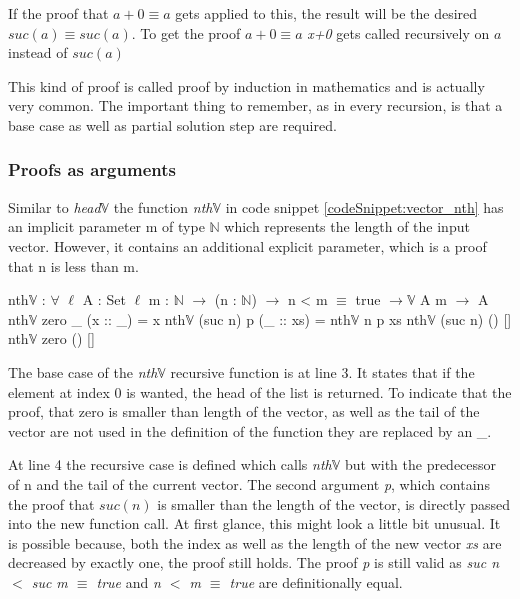 If the proof that $a + 0 \equiv a$ gets applied to this, the result will be the desired $suc(a) \equiv suc(a)$. 
To get the proof $a + 0 \equiv a$ \emph{x+0} gets called recursively on $a$ instead of $suc(a)$

This kind of proof is called proof by induction in mathematics and is actually very common.
The important thing to remember, as in every recursion, is that a base case as well as partial solution step are required.

\subsubsection{Proofs as arguments}

Similar to \emph{head$\mathbb{V}$} the function \emph{nth$\mathbb{V}$} in code snippet \ref{codeSnippet:vector_nth} has an implicit parameter m of type $\mathbb{N}$ which represents the length of the input vector. 
However, it contains an additional explicit parameter, which is a proof that n is less than m.

\begin{codesnippet}[mathescape=true, caption={Definition of \emph{nth} function in Agda}, label={codeSnippet:vector_nth}]
nth$\mathbb{V}$ : $\forall$ {$\ell$} {A : Set $\ell$} {m : $\mathbb{N}$} $\rightarrow$
       (n : $\mathbb{N}$) $\rightarrow$ n < m $\equiv$ true $\rightarrow \mathbb{V}$ A m $\rightarrow$ A
nth$\mathbb{V}$ zero _ (x :: _) = x
nth$\mathbb{V}$ (suc n) p (_ :: xs) = nth$\mathbb{V}$ n p xs
nth$\mathbb{V}$ (suc n) () []
nth$\mathbb{V}$ zero () []
\end{codesnippet}

The base case of the \emph{nth$\mathbb{V}$} recursive function is at line 3. It states that if the element at index 0 is wanted, the head of the list is returned.
To indicate that the proof, that zero is smaller than length of the vector, as well as the tail of the vector are not used in the definition of the function they are replaced by an \_.

At line 4 the recursive case is defined which calls \emph{nth$\mathbb{V}$} but with the predecessor of n and the tail of the current vector.
The second argument \emph{p}, which contains the proof that $suc(n)$ is smaller than the length of the vector, is directly passed into the new function call. 
At first glance, this might look a little bit unusual. 
It is possible because, both the index as well as the length of the new vector \emph{xs} are decreased by exactly one, the proof still holds.
The proof \emph{p} is still valid as \emph{suc n $<$ suc m $\equiv$ true} and \emph{n $<$ m $\equiv$ true} are definitionally equal.

